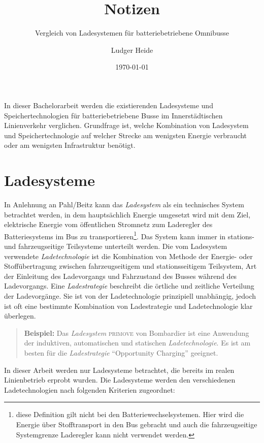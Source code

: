 \documentclass{scrreprt}
\title{Notizen}
\subtitle{Vergleich von Ladesystemen für batteriebetriebene Omnibusse}
\date{\today}
\author{Ludger Heide}
\begin{document}

\maketitle



In dieser Bachelorarbeit werden die existierenden Ladesysteme und Speichertechnologien für batteriebetriebene Busse im Innerstädtischen Linienverkehr verglichen. Grundfrage ist, welche Kombination von Ladesystem und Speichertechnologie auf welcher Strecke am wenigsten Energie verbraucht oder am wenigsten Infrastruktur benötigt.

\chapter{Ladesysteme}

In Anlehnung an Pahl/Beitz \cite[S. 258]{feldhusen2013pahl} kann das \emph{Ladesystem} als ein technisches System betrachtet werden, in dem hauptsächlich Energie umgesetzt wird mit dem Ziel, elektrische Energie vom öffentlichen Stromnetz zum Laderegler des Batteriesystems im Bus zu transportieren\footnote{diese Definition gilt nicht bei den Batteriewechselsystemen. Hier wird die Energie über Stofftransport in den Bus gebracht und auch die fahrzeugseitige Systemgrenze Laderegler kann nicht verwendet werden.}. Das System kann immer in stations- und fahrzeugseitige Teilsysteme unterteilt werden. Die vom Ladesystem verwendete \emph{Ladetechnologie} ist die Kombination von Methode der Energie- oder Stoffübertragung zwischen fahrzeugseitigem und stationsseitigem Teilsystem, Art der Einleitung des Ladevorgangs und Fahrzustand des Busses während des Ladevorgangs. Eine \emph{Ladestrategie} beschreibt die örtliche und zeitliche Verteilung der Ladevorgänge. Sie ist von der Ladetechnologie prinzipiell unabhängig, jedoch ist oft eine bestimmte Kombination von Ladestrategie und Ladetechnologie klar überlegen.

\begin{quote}
	\textbf{Beispiel:} Das \emph{Ladesystem} \textsc{primove} von Bombardier ist eine Anwendung der induktiven, automatischen und statischen \emph{Ladetechnologie}. Es ist am besten für die \emph{Ladestrategie} "`Opportunity Charging"' geeignet.
\end{quote}

In dieser Arbeit werden nur Ladesysteme betrachtet, die bereits im realen Linienbetrieb erprobt wurden. Die Ladesysteme werden den verschiedenen Ladetechnologien nach folgenden Kriterien zugeordnet:
\end{document}
